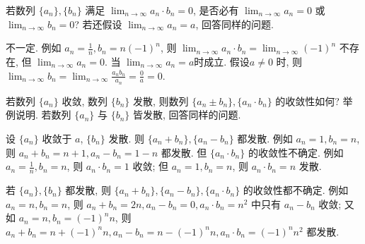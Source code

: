 \begin{exercise}[1.2.10]
    若数列 $\{a_n\}, \{b_n\}$ 满足 $\lim_{n\to\infty} a_n \cdot b_n = 0$, 是否必有 $\lim_{n\to\infty} a_n = 0$ 或 $\lim_{n\to\infty} b_n = 0$?
    若还假设 $\lim_{n\to\infty} a_n = a$, 回答同样的问题.
\end{exercise}

\begin{solution}
    不一定. 例如 $a_n = \frac{1}{n}, b_n = n(-1)^n$, 则 $\lim_{n\to\infty} a_n \cdot b_n = \lim_{n\to\infty} (-1)^n$ 不存在, 但 $\lim_{n\to\infty} a_n = 0$.
    当 $\lim_{n\to\infty} a_n = a$时成立. 假设$a \ne 0$ 时, 则$\lim_{n\to\infty} b_n = \lim_{n\to\infty} \frac{a_n b_n}{a_n} = \frac{0}{a} = 0$.
\end{solution}

\begin{exercise}[1.2.11]
    若数列 $\{a_n\}$ 收敛, 数列 $\{b_n\}$ 发散, 则数列 $\{a_n \pm b_n\}, \{a_n \cdot b_n\}$ 的收敛性如何? 举例说明. 若数列 $\{a_n\}$ 与 $\{b_n\}$ 皆发散, 回答同样的问题.
\end{exercise}

\begin{solution}
    设 $\{a_n\}$ 收敛于 $a$, $\{b_n\}$ 发散. 则 $\{a_n + b_n\}, \{a_n - b_n\}$ 都发散. 例如 $a_n = 1, b_n = n$, 则 $a_n + b_n = n + 1, a_n - b_n = 1 - n$ 都发散. 但 $\{a_n \cdot b_n\}$ 的收敛性不确定. 例如 $a_n = \frac{1}{n}, b_n = n$, 则 $a_n \cdot b_n = 1$ 收敛; 但 $a_n = 1, b_n = n$, 则 $a_n \cdot b_n = n$ 发散.

    若 $\{a_n\}, \{b_n\}$ 都发散, 则 $\{a_n + b_n\}, \{a_n - b_n\}, \{a_n \cdot b_n\}$ 的收敛性都不确定. 例如 $a_n = n, b_n = n$, 则 $a_n + b_n = 2n, a_n - b_n = 0, a_n \cdot b_n = n^2$ 中只有 $a_n - b_n$ 收敛; 又如 $a_n = n, b_n = (-1)^n n$, 则 $a_n + b_n = n + (-1)^n n, a_n - b_n = n - (-1)^n n, a_n \cdot b_n = (-1)^n n^2$ 都发散.
\end{solution}



